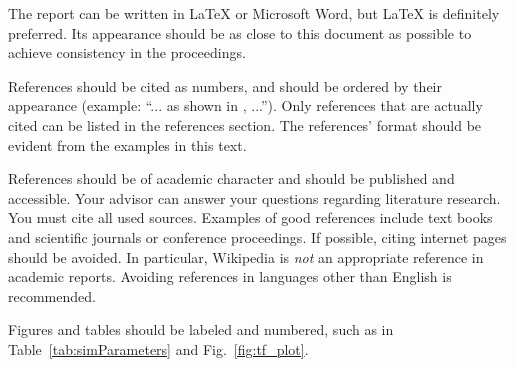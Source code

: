 \documentclass[journal, a4paper]{IEEEtran}
\begin{document}
    The report can be written in \LaTeX{} or Microsoft Word, but \LaTeX{} is definitely preferred.
    Its appearance should be as close to this document as possible to achieve consistency in the proceedings.

    References should be cited as numbers, and should be ordered by their appearance (example: ``... as shown in \cite{HOP96}, ...'').
    Only references that are actually cited can be listed in the references section.
    The references' format should be evident from the examples in this text.

    References should be of academic character and should be published and accessible.
    Your advisor can answer your questions regarding literature research.
    You must cite all used sources.
    Examples of good references include text books and scientific journals or conference proceedings.
    If possible, citing internet pages should be avoided. In particular, Wikipedia is \emph{not} an appropriate reference in academic reports.
    Avoiding references in languages other than English is recommended.

    Figures and tables should be labeled and numbered, such as in Table~\ref{tab:simParameters} and Fig.~\ref{fig:tf_plot}.


\end{document}
